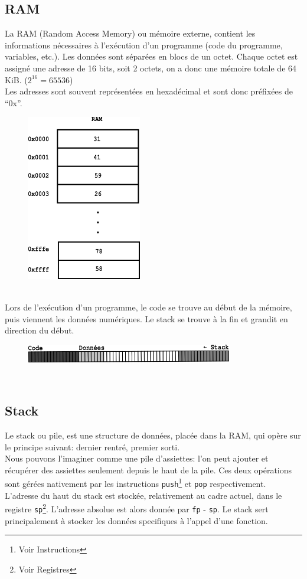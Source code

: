 \documentclass{article}
\begin{document}
\subsection{RAM}
La RAM (Random Access Memory) ou mémoire externe, contient les informations nécessaires à l'exécution d'un programme (code du programme, variables, etc.). Les données sont séparées en blocs de un octet. Chaque octet est assigné une adresse de 16 bits, soit 2 octets, on a donc une mémoire totale de 64 KiB. ($2^{16} = 65536$)
\\Les adresses sont souvent représentées en hexadécimal et sont donc préfixées de “0x”.
\begin{figure}[htp]
    \centering
    \includegraphics[width=5cm]{images/ram_diagram.png}
    \label{fig:ram}
\end{figure}
\\
Lors de l'exécution d'un programme, le code se trouve au début de la mémoire, puis viennent les données numériques. Le stack se trouve à la fin et grandit en direction du début.
\begin{figure}[htp]
    \centering
    \includegraphics[width=9cm]{images/ram_layout_diagram.png}
    \label{fig:ram_layout}
\end{figure}
\\
\subsection{Stack}
Le stack ou pile, est une structure de données, placée dans la RAM, qui opère sur le principe suivant: dernier rentré, premier sorti. 
\\Nous pouvons l'imaginer comme une pile d'assiettes: l'on peut ajouter et récupérer des assiettes seulement depuis le haut de la pile.
Ces deux opérations sont gérées nativement par les instructions \texttt{push}\footnote{Voir Instructions} et \texttt{pop} respectivement.
\\
L'adresse du haut du stack est stockée, relativement au cadre actuel, dans le registre \texttt{sp}\footnote{Voir Registres}. L'adresse absolue est alors donnée par \texttt{fp} - \texttt{sp}. Le stack sert principalement à stocker les données specifiques à l'appel d'une fonction. 
\end{document}
